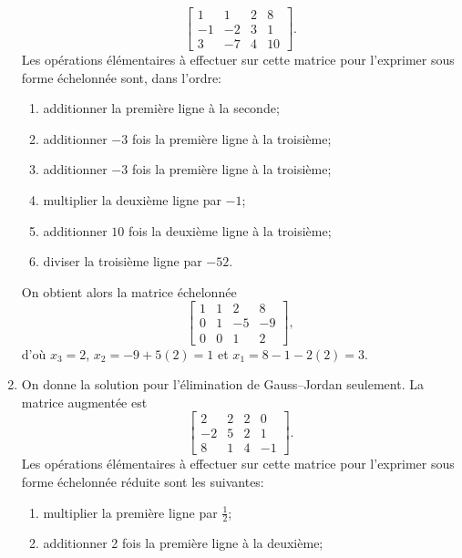 \begin{exercice}
\begin{sol}
\begin{enumerate}
\begin{displaymath}
\begin{bmatrix}
           1 &  1 &  2 &  8 \\
          -1 & -2 &  3 &  1 \\
           3 & -7 &  4 & 10
         \end{bmatrix}.
      \end{displaymath}
      Les opérations élémentaires à effectuer sur cette matrice pour
      l'exprimer sous forme échelonnée sont, dans l'ordre:
      \begin{enumerate}[1.]
      \item additionner la première ligne à la seconde;
      \item additionner $-3$ fois la première ligne à la troisième;
      \item additionner $-3$ fois la première ligne à la troisième;
      \item multiplier la deuxième ligne par $-1$;
      \item additionner $10$ fois la deuxième ligne à la troisième;
      \item diviser la troisième ligne par $-52$.
      \end{enumerate}
      On obtient alors la matrice échelonnée
      \begin{displaymath}
        \begin{bmatrix}
          1 &  1 &  2 &  8 \\
          0 &  1 & -5 & -9 \\
          0 &  0 &  1 &  2
         \end{bmatrix},
      \end{displaymath}
      d'où $x_3 = 2$, $x_2 = -9 + 5(2) = 1$ et $x_1 = 8 - 1 - 2(2) =
      3$.
    \item On donne la solution pour l'élimination de Gauss--Jordan
      seulement. La matrice augmentée est
      \begin{displaymath}
        \begin{bmatrix}
           2 &  2 &  2 &  0 \\
          -2 &  5 &  2 &  1 \\
           8 &  1 &  4 & -1
         \end{bmatrix}.
      \end{displaymath}
      Les opérations élémentaires à effectuer sur cette matrice pour
      l'exprimer sous forme échelonnée réduite sont les suivantes:
      \begin{enumerate}[1.]
      \item multiplier la première ligne par $\frac{1}{2}$;
      \item additionner 2 fois la première ligne à la deuxième;

\end{enumerate}
\end{enumerate}
\end{sol}
\end{exercice}
